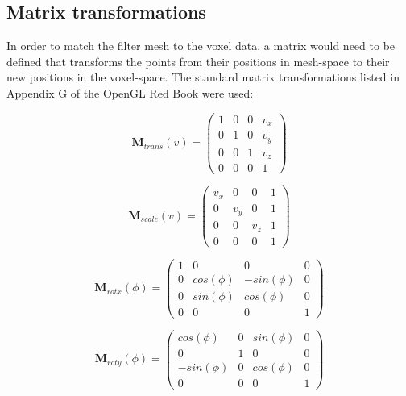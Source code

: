 \subsection{Matrix transformations}

In order to match the filter mesh to the voxel data, a matrix would need to be defined that transforms the points from their positions
in mesh-space to their new positions in the voxel-space.
The standard matrix transformations listed in Appendix G of the OpenGL Red Book \cite{RedBook} were used:

\begin{equation}
	\mathbf{M}_{trans}(v) =
	\left(\begin{array}{cccc}
		1 & 0 & 0 & v_{x} \\
		0 & 1 & 0 & v_{y} \\
		0 & 0 & 1 & v_{z} \\
		0 & 0 & 0 & 1
	\end{array} \right)
\end{equation}

\begin{equation}
	\mathbf{M}_{scale}(v) =
	\left(\begin{array}{cccc}
		v_{x} & 0 & 0 & 1 \\
		0 & v_{y} & 0 & 1 \\
		0 & 0 & v_{z} & 1 \\
		0 & 0 & 0 & 1
	\end{array} \right)
\end{equation}

\begin{equation}
	\mathbf{M}_{rotx}(\phi) =
	\left(\begin{array}{cccc}
		1 & 0 & 0 & 0 \\
		0 & cos(\phi) & -sin(\phi) & 0 \\
		0 & sin(\phi) & cos(\phi) & 0 \\
		0 & 0 & 0 & 1
	\end{array} \right)
\end{equation}

\begin{equation}
	\mathbf{M}_{roty}(\phi) =
	\left(\begin{array}{cccc}
		cos(\phi) & 0 & sin(\phi) & 0 \\
		0 & 1 & 0 & 0 \\
		-sin(\phi) & 0 & cos(\phi) & 0 \\
		0 & 0 & 0 & 1
	\end{array} \right)
\end{equation}

